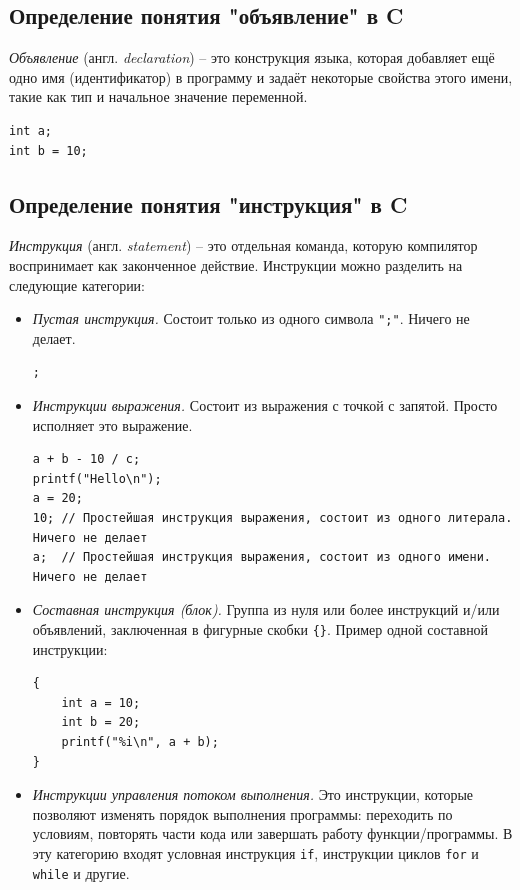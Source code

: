 \documentclass[10pt]{article}
\begin{document}
\subsection*{Определение понятия "объявление"{} в C}
\textit{Объявление} (англ. \textit{declaration}) -- это конструкция языка, которая добавляет ещё одно имя (идентификатор) в программу и задаёт некоторые свойства этого имени, такие как тип и начальное значение переменной.
\begin{lstlisting}
int a;
int b = 10;
\end{lstlisting}

\subsection*{Определение понятия "инструкция"{} в C}
\textit{Инструкция} (англ. \textit{statement}) -- это отдельная команда, которую компилятор воспринимает как законченное действие. Инструкции можно разделить на следующие категории:
\begin{itemize}
\item \textit{Пустая инструкция.} Состоит только из одного символа \texttt{";"}. Ничего не делает.
\begin{lstlisting}
;
\end{lstlisting}

\item \textit{Инструкции выражения.} Состоит из выражения с точкой с запятой. Просто исполняет это выражение.
\begin{lstlisting}
a + b - 10 / c;
printf("Hello\n");
a = 20;
10;	// Простейшая инструкция выражения, состоит из одного литерала. Ничего не делает
a;	// Простейшая инструкция выражения, состоит из одного имени. Ничего не делает
\end{lstlisting}

\item \textit{Составная инструкция (блок).} Группа из нуля или более инструкций и/или объявлений, заключенная в фигурные скобки \texttt{\{\}}.
Пример одной составной инструкции:
\begin{lstlisting}
{
	int a = 10;
	int b = 20;
	printf("%i\n", a + b);
}
\end{lstlisting}

\item \textit{Инструкции управления потоком выполнения.} Это инструкции, которые позволяют изменять порядок выполнения программы: переходить по условиям, повторять части кода или завершать работу функции/программы. В эту категорию входят условная инструкция \texttt{if}, инструкции циклов \texttt{for} и \texttt{while} и другие.
\end{itemize}
\end{document}
